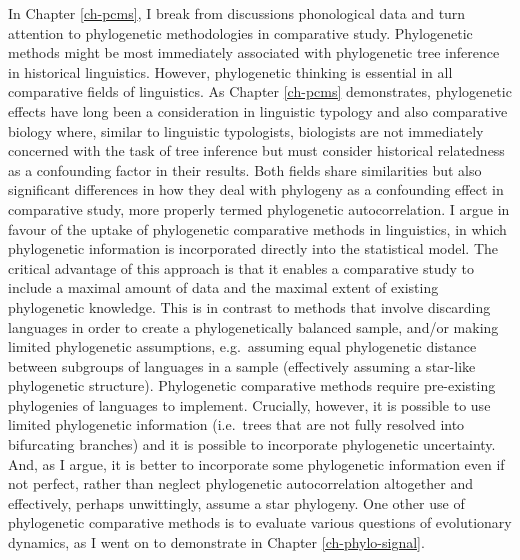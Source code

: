 In Chapter \ref{ch-pcms}, I break from discussions phonological data and turn attention to phylogenetic methodologies in comparative study. Phylogenetic methods might be most immediately associated with phylogenetic tree inference in historical linguistics. However, phylogenetic thinking is essential in all comparative fields of linguistics. As Chapter \ref{ch-pcms} demonstrates, phylogenetic effects have long been a consideration in linguistic typology and also comparative biology where, similar to linguistic typologists, biologists are not immediately concerned with the task of tree inference but must consider historical relatedness as a confounding factor in their results. Both fields share similarities but also significant differences in how they deal with phylogeny as a confounding effect in comparative study, more properly termed phylogenetic autocorrelation. I argue in favour of the uptake of phylogenetic comparative methods in linguistics, in which phylogenetic information is incorporated directly into the statistical model. The critical advantage of this approach is that it enables a comparative study to include a maximal amount of data and the maximal extent of existing phylogenetic knowledge. This is in contrast to methods that involve discarding languages in order to create a phylogenetically balanced sample, and/or making limited phylogenetic assumptions, e.g.~assuming equal phylogenetic distance between subgroups of languages in a sample (effectively assuming a star-like phylogenetic structure). Phylogenetic comparative methods require pre-existing phylogenies of languages to implement. Crucially, however, it is possible to use limited phylogenetic information (i.e.~trees that are not fully resolved into bifurcating branches) and it is possible to incorporate phylogenetic uncertainty. And, as I argue, it is better to incorporate some phylogenetic information even if not perfect, rather than neglect phylogenetic autocorrelation altogether and effectively, perhaps unwittingly, assume a star phylogeny. One other use of phylogenetic comparative methods is to evaluate various questions of evolutionary dynamics, as I went on to demonstrate in Chapter \ref{ch-phylo-signal}.

